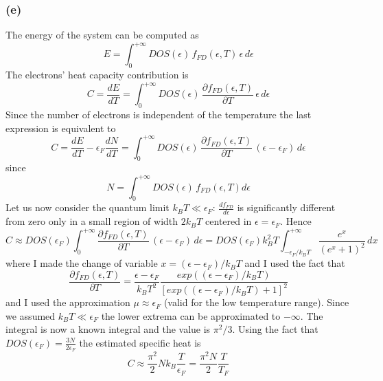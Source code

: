 \documentclass{article}
\begin{document}
\subsubsection*{(e)}
The energy of the system can be computed as 
\begin{equation*}
    E = \int_0^{+\infty} DOS(\epsilon) \, f_{FD}(\epsilon, T) \, \epsilon \, d\epsilon
\end{equation*}
The electrons' heat capacity contribution is
\begin{equation*}
    C = \frac{dE}{dT} = \int_0^{+\infty} DOS(\epsilon) \, \frac{\partial f_{FD}(\epsilon, T)}{\partial T} \, \epsilon \, d\epsilon
\end{equation*}
Since the number of electrons is independent of the temperature the last expression is equivalent to 
\begin{equation*}
    C = \frac{dE}{dT} - \epsilon_F\frac{dN}{dT} = \int_0^{+\infty} DOS(\epsilon) \, \frac{\partial f_{FD}(\epsilon, T)}{\partial T} \, (\epsilon -\epsilon_F) \, d\epsilon
\end{equation*}
since 
\begin{equation*}
    N =\int_0^{+\infty} DOS(\epsilon) \, f_{FD}(\epsilon, T) d\epsilon
\end{equation*}
Let us now consider the quantum limit $k_BT \ll \epsilon_F$: $\frac{df_{FD}}{d\epsilon}$ is significantly different from zero only 
in a small region of width $2k_BT$ centered in $\epsilon=\epsilon_F$. Hence
\begin{equation*}
    C \approx DOS(\epsilon_F) \int_0^{+\infty} \frac{\partial f_{FD}(\epsilon, T)}{\partial T} \, (\epsilon - \epsilon_F) \, d\epsilon = 
    DOS(\epsilon_F) k_B^2T \int_{-\epsilon_F/k_BT}^{+\infty} \frac{e^x}{(e^x + 1)^2} \, dx 
\end{equation*}
where I made the change of variable $x=(\epsilon - \epsilon_F)/k_BT$ and I used the fact that 
\begin{equation*}
    \frac{\partial f_{FD}(\epsilon, T)}{\partial T} = \frac{\epsilon - \epsilon_F}{k_BT^2} \frac{exp((\epsilon - \epsilon_F)/k_BT)}{[exp((\epsilon - \epsilon_F)/k_BT) + 1]^2}
\end{equation*}
and I used the approximation $\mu \approx \epsilon_F$ (valid for the low temperature range).
Since we assumed $k_BT \ll \epsilon_F$ the lower extrema can be approximated to $-\infty$. The integral is now a known integral and the value is $\pi^2/3$. Using the fact that 
$DOS(\epsilon_F) = \frac{3N}{2\epsilon_F}$ the estimated specific heat is 
\begin{equation*}
    C \approx \frac{\pi^2}{2} N k_B \frac{T}{\epsilon_F} = \frac{\pi^2N}{2}\frac{T}{T_F}
\end{equation*}
\end{document}
